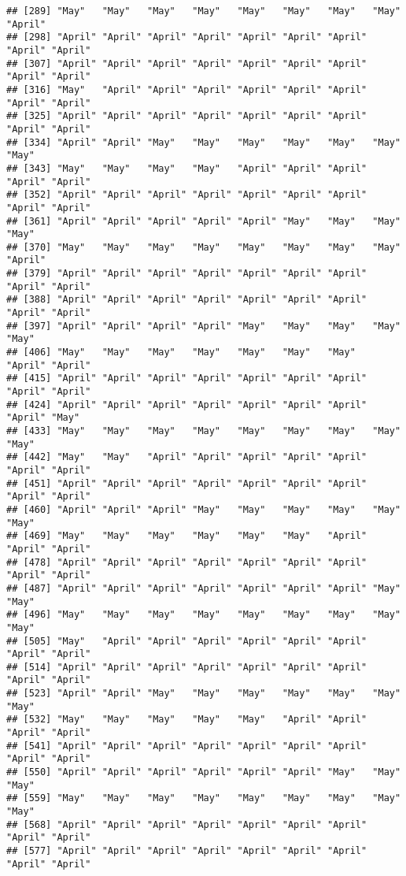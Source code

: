 \documentclass[
]{article}
\begin{document}
\begin{verbatim}
## [289] "May"   "May"   "May"   "May"   "May"   "May"   "May"   "May"   "April"
## [298] "April" "April" "April" "April" "April" "April" "April" "April" "April"
## [307] "April" "April" "April" "April" "April" "April" "April" "April" "April"
## [316] "May"   "April" "April" "April" "April" "April" "April" "April" "April"
## [325] "April" "April" "April" "April" "April" "April" "April" "April" "April"
## [334] "April" "April" "May"   "May"   "May"   "May"   "May"   "May"   "May"  
## [343] "May"   "May"   "May"   "May"   "April" "April" "April" "April" "April"
## [352] "April" "April" "April" "April" "April" "April" "April" "April" "April"
## [361] "April" "April" "April" "April" "April" "May"   "May"   "May"   "May"  
## [370] "May"   "May"   "May"   "May"   "May"   "May"   "May"   "May"   "April"
## [379] "April" "April" "April" "April" "April" "April" "April" "April" "April"
## [388] "April" "April" "April" "April" "April" "April" "April" "April" "April"
## [397] "April" "April" "April" "April" "May"   "May"   "May"   "May"   "May"  
## [406] "May"   "May"   "May"   "May"   "May"   "May"   "May"   "April" "April"
## [415] "April" "April" "April" "April" "April" "April" "April" "April" "April"
## [424] "April" "April" "April" "April" "April" "April" "April" "April" "May"  
## [433] "May"   "May"   "May"   "May"   "May"   "May"   "May"   "May"   "May"  
## [442] "May"   "May"   "April" "April" "April" "April" "April" "April" "April"
## [451] "April" "April" "April" "April" "April" "April" "April" "April" "April"
## [460] "April" "April" "April" "May"   "May"   "May"   "May"   "May"   "May"  
## [469] "May"   "May"   "May"   "May"   "May"   "May"   "April" "April" "April"
## [478] "April" "April" "April" "April" "April" "April" "April" "April" "April"
## [487] "April" "April" "April" "April" "April" "April" "April" "May"   "May"  
## [496] "May"   "May"   "May"   "May"   "May"   "May"   "May"   "May"   "May"  
## [505] "May"   "April" "April" "April" "April" "April" "April" "April" "April"
## [514] "April" "April" "April" "April" "April" "April" "April" "April" "April"
## [523] "April" "April" "May"   "May"   "May"   "May"   "May"   "May"   "May"  
## [532] "May"   "May"   "May"   "May"   "May"   "April" "April" "April" "April"
## [541] "April" "April" "April" "April" "April" "April" "April" "April" "April"
## [550] "April" "April" "April" "April" "April" "April" "May"   "May"   "May"  
## [559] "May"   "May"   "May"   "May"   "May"   "May"   "May"   "May"   "May"  
## [568] "April" "April" "April" "April" "April" "April" "April" "April" "April"
## [577] "April" "April" "April" "April" "April" "April" "April" "April" "April"

\end{verbatim}
\end{document}
